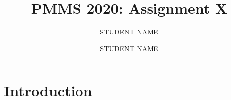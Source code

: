 \documentclass[a4paper,UKenglish,cleveref, autoref, thm-restate]{lipics-v2019}
\title{PMMS 2020: Assignment X}
\author{STUDENT NAME}{STUDENT NUMBER}{EMAIL ADDRESS}{}{}
\author{STUDENT NAME}{STUDENT NUMBER}{EMAIL ADDRESS}{}{}
\begin{document}
	\maketitle
	


	
	\section{Introduction}
	\lipsum[1-20] \cite{odroid}
	
	
		
	
	
\end{document}
